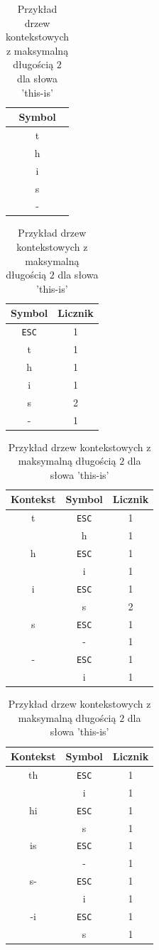 \documentclass{../notatki}
\begin{document}
\begin{table}[h]
  \centering
  \begin{tabular}{|c|}
    \hline
    Symbol \\ \hline
    t \\ \hline
    h \\ \hline
    i \\ \hline
    s \\ \hline
    - \\ \hline

  \end{tabular}
  \begin{tabular}{c|c}
    Symbol & Licznik \\ \hline
    \texttt{ESC} & 1 \\ \hline
    t & 1 \\ \hline
    h & 1 \\ \hline
    i & 1 \\ \hline
    s & 2 \\ \hline
    - & 1 \\
  \end{tabular}
  \begin{tabular}{c|c|c}
    Kontekst & Symbol & Licznik \\
    \hline
    t & \texttt{ESC} & 1 \\
    & h & 1 \\
    \hline
    h & \texttt{ESC} & 1 \\
    & i & 1 \\
    \hline
    i & \texttt{ESC} & 1 \\
    & s & 2 \\
    \hline
    s & \texttt{ESC} & 1 \\
    & - & 1 \\
    \hline
    - & \texttt{ESC} & 1 \\
    & i & 1 \\
  \end{tabular}
  \begin{tabular}{c|c|c}
    Kontekst & Symbol & Licznik \\
    \hline
    th & \texttt{ESC} & 1 \\
    & i & 1 \\
    \hline
    hi & \texttt{ESC} & 1 \\
    & s & 1 \\
    \hline
    is & \texttt{ESC} & 1 \\
    & - & 1 \\
    \hline
    s- & \texttt{ESC} & 1 \\
    & i & 1 \\
    \hline
    -i & \texttt{ESC} & 1 \\
    & s & 1 \\
  \end{tabular}
  \caption{Przykład drzew kontekstowych z maksymalną długością $2$
  dla słowa 'this-is'}
\end{table}
\end{document}
